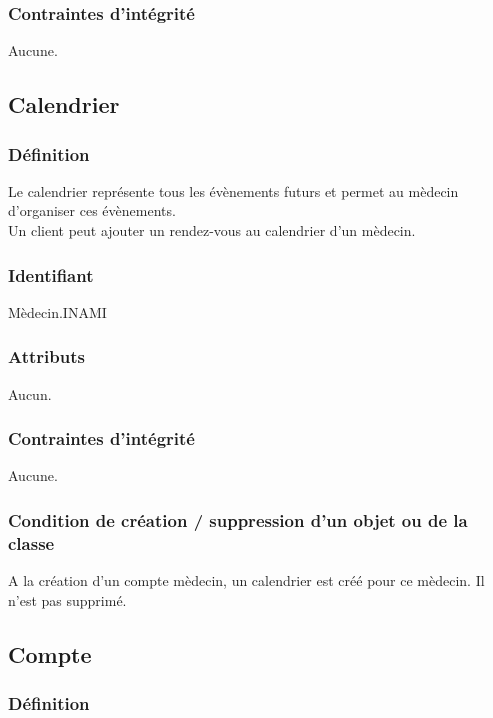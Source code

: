 \documentclass[a4paper, 11pt]{report}
\begin{document}
\subsubsection{Contraintes d'intégrité}

Aucune.

\subsection{Calendrier}

\subsubsection{Définition}

Le calendrier représente tous les évènements futurs et permet
au mèdecin d'organiser ces évènements. \\
Un client peut ajouter un rendez-vous au calendrier d'un mèdecin.

\subsubsection{Identifiant}

Mèdecin.INAMI

\subsubsection{Attributs}

Aucun.

\subsubsection{Contraintes d'intégrité}

Aucune.

\subsubsection{Condition de création / suppression d'un objet ou de la classe}

A la création d'un compte mèdecin, un calendrier est créé pour ce mèdecin. 
Il n'est pas supprimé.


\subsection{Compte}

\subsubsection{Définition}
\end{document}
